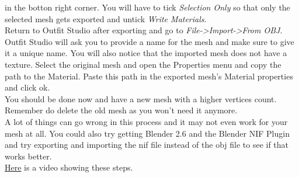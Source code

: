 in the botton right corner. You will have to tick \textit{Selection Only} so that only the selected mesh gets exported and untick \textit{Write Materials}.\\
Return to Outfit Studio after exporting and go to \textit{File->Import->From OBJ}. Outfit Studio will ask you to provide a name for the 
mesh and make sure to give it a unique name. You will also notice that the imported mesh does not have a texture. Select the original 
mesh and open the Properties menu and copy the path to the Material. Paste this path in the exported mesh's Material properties and click ok.\\
You should be done now and have a new mesh with a higher vertices count. Remember do delete the old mesh as you won't need it anymore.\\
A lot of things can go wrong in this process and it may not even work for your mesh at all. You could also try getting Blender 2.6 and the 
Blender NIF Plugin and try exporting and importing the nif file instead of the obj file to see if that works better.\\
\href{https://drive.google.com/uc?export=download&id=1ij3R3v7rcy0oWQO57sLfpLeYF6JndHRu}{Here} is a video showing these steps.